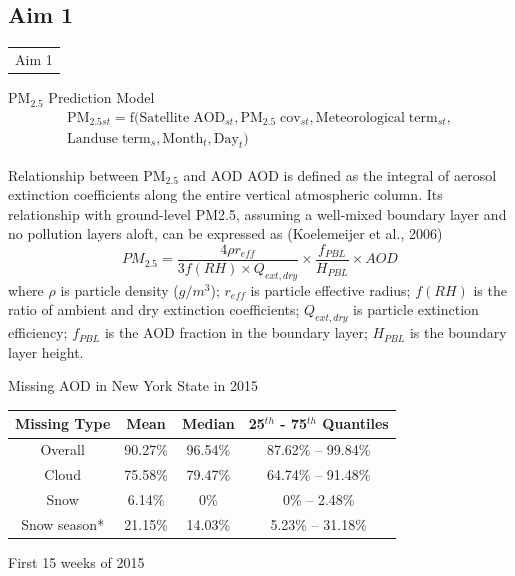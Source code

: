 \documentclass[handout]{beamer} %
\begin{document}

\subsection*{Aim 1}

\begin{frame}{}
    \begin{table}
        \LARGE
        \centering
        \begin{tabular}{c}
             \textcolor[rgb]{0.1,0.1,0.6}{Aim 1}
        \end{tabular}
    \end{table}
\end{frame}

\begin{frame}{PM$_{2.5}$ Prediction Model}
    \begin{align*}
        \mathrm{PM_{2.5\mathit{st}}=f(Satellite\;AOD_{\mathit{st}},PM_{2.5}\;cov_{\mathit{st}},Meteorological\;term_{\mathit{st}}, } \\
        \mathrm{Landuse\;term_\mathit{s},Month_\mathit{t}, Day_\mathit{t})}
    \end{align*}
\end{frame}

\begin{frame}{Relationship between PM$_{2.5}$ and AOD}
    AOD is defined as the integral of aerosol extinction coefficients along the entire vertical atmospheric column. Its relationship with ground-level PM2.5, assuming a well-mixed boundary layer and no pollution layers aloft, can be expressed as (Koelemeijer et al., 2006)
    \begin{equation*}
        PM_{2.5}=\frac{4\rho r_{eff}}{3f(RH)\times Q_{ext,dry}}\times\frac{f_{PBL}}{H_{PBL}}\times AOD
    \end{equation*}
    where $\rho$ is particle density ($g/m^3$); $r_{eff}$ is particle effective radius; $f(RH)$ is the ratio of ambient and dry extinction coefficients; $Q_{ext,dry}$ is particle extinction efficiency; $f_{PBL}$ is the AOD fraction in the boundary layer; $H_{PBL}$ is the boundary layer height.
\end{frame}

\begin{frame}{Missing AOD in New York State in 2015}
    \begin{table}
        \centering
        \begin{tabular}{c|c|c|c}
            \hline
            Missing Type & Mean & Median & 25$^{th}$ - 75$^{th}$ Quantiles \\
            \hline
            Overall & 90.27\% & 96.54\% & 87.62\% -- 99.84\% \\
            Cloud & 75.58\% & 79.47\% & 64.74\% -- 91.48\% \\
            Snow & 6.14\% & 0\% & 0\% -- 2.48\% \\
            Snow season* & 21.15\% & 14.03\% & 5.23\% -- 31.18\% \\
            \hline
        \end{tabular}
    \end{table}
    {\footnotesize * First 15 weeks of 2015}
\end{frame}
\end{document}
